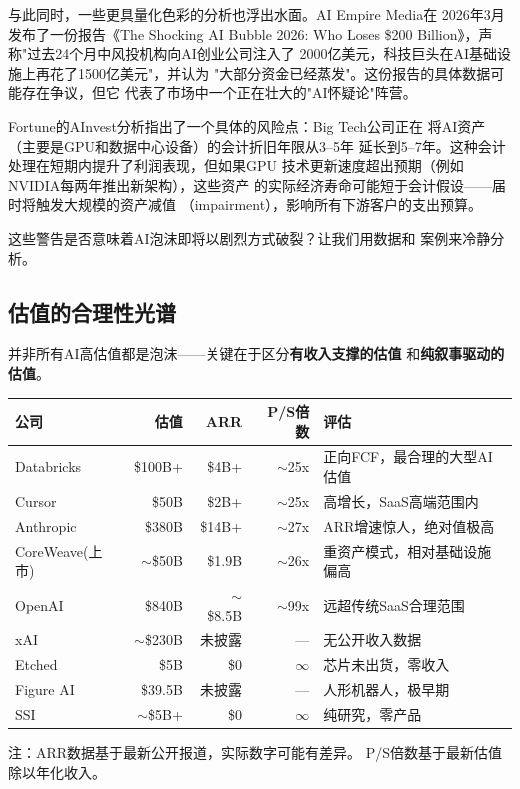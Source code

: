 与此同时，一些更具量化色彩的分析也浮出水面。AI Empire Media在
2026年3月发布了一份报告《The Shocking AI Bubble 2026: Who Loses
\$200 Billion》，声称"过去24个月中风投机构向AI创业公司注入了
2000亿美元，科技巨头在AI基础设施上再花了1500亿美元"，并认为
"大部分资金已经蒸发"。这份报告的具体数据可能存在争议，但它
代表了市场中一个正在壮大的"AI怀疑论"阵营。

Fortune的AInvest分析指出了一个具体的风险点：Big Tech公司正在
将AI资产（主要是GPU和数据中心设备）的会计折旧年限从3--5年
延长到5--7年。这种会计处理在短期内提升了利润表现，但如果GPU
技术更新速度超出预期（例如NVIDIA每两年推出新架构），这些资产
的实际经济寿命可能短于会计假设——届时将触发大规模的资产减值
（impairment），影响所有下游客户的支出预算。

这些警告是否意味着AI泡沫即将以剧烈方式破裂？让我们用数据和
案例来冷静分析。

\subsection{估值的合理性光谱}
\label{subsec:fund-valuation-spectrum}

并非所有AI高估值都是泡沫——关键在于区分\textbf{有收入支撑的估值}
和\textbf{纯叙事驱动的估值}。

\begin{keybox}[AI公司估值合理性分析（2026年3月）]
\small
\begin{tabularx}{\textwidth}{l r r r X}
\toprule
\rowcolor{figLightGray}
\textbf{公司} & \textbf{估值} & \textbf{ARR}
  & \textbf{P/S倍数} & \textbf{评估} \\
\midrule
Databricks       & \$100B+ & \$4B+  & $\sim$25x
  & 正向FCF，最合理的大型AI估值 \\
Cursor            & \$50B   & \$2B+  & $\sim$25x
  & 高增长，SaaS高端范围内 \\
Anthropic         & \$380B  & \$14B+ & $\sim$27x
  & ARR增速惊人，绝对值极高 \\
CoreWeave(上市)   & $\sim$\$50B & \$1.9B & $\sim$26x
  & 重资产模式，相对基础设施偏高 \\
\midrule
OpenAI            & \$840B  & $\sim$\$8.5B & $\sim$99x
  & 远超传统SaaS合理范围 \\
xAI               & $\sim$\$230B & 未披露 & ---
  & 无公开收入数据 \\
Etched            & \$5B    & \$0    & $\infty$
  & 芯片未出货，零收入 \\
Figure AI         & \$39.5B & 未披露 & ---
  & 人形机器人，极早期 \\
SSI               & $\sim$\$5B+ & \$0 & $\infty$
  & 纯研究，零产品 \\
\bottomrule
\end{tabularx}

\medskip
\noindent 注：ARR数据基于最新公开报道，实际数字可能有差异。
P/S倍数基于最新估值除以年化收入。
\end{keybox}


